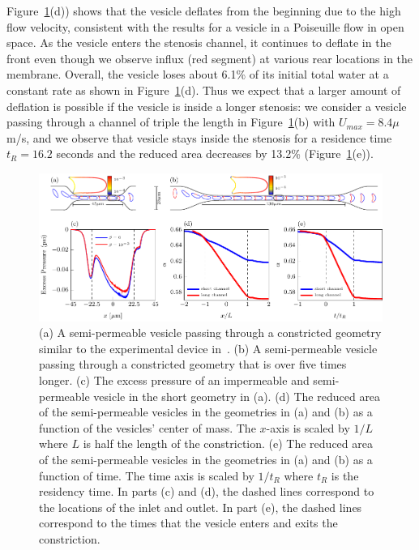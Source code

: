 \documentclass[9pt,twocolumn,twoside,lineno]{pnas-new}
\newif\ifTikz
\begin{document}
Figure~\ref{fig:stenosisComposite}(d)) shows
that the vesicle
deflates from the beginning due to the high flow velocity, consistent
with the results for a vesicle in a Poiseuille flow in open space. As
the vesicle enters the stenosis channel, it continues to
deflate in the front even though we observe influx (red segment) at
various rear locations in the membrane. Overall, the vesicle loses about 6.1\% of its initial total water at a constant rate as shown in
Figure~\ref{fig:stenosisComposite}(d).  Thus we expect that a larger amount of deflation is possible
if the vesicle is inside a longer stenosis: we consider a vesicle passing
through a channel of triple the length in
Figure~\ref{fig:stenosisComposite}(b) with $U_{max}=8.4 \mu$m/s, and we observe that vesicle stays inside the stenosis  for a residence time $t_R=16.2$ seconds and the reduced
area decreases by 13.2\% (Figure~\ref{fig:stenosisComposite}(e)).

\begin{figure}[htp]
  \ifTikz
  
  \else
  \includegraphics{figures/stenosisComposite.pdf}
  \fi
  \caption{\label{fig:stenosisComposite} (a) A semi-permeable vesicle
  passing through a constricted geometry similar to the experimental
  device in~\cite{abk-fai-sto2006}. (b) A semi-permeable vesicle passing
  through a constricted geometry that is over five times longer. (c) The
  excess pressure of an impermeable and semi-permeable vesicle in the
  short geometry in (a). (d) The reduced area of the semi-permeable
  vesicles in the geometries in (a) and (b) as a function of the
  vesicles' center of mass. The $x$-axis is scaled by $1/L$ where $L$ is
  half the length of the constriction. (e) The reduced area of the
  semi-permeable vesicles in the geometries in (a) and (b) as a function
  of time. The time axis is scaled by $1/t_R$ where $t_R$ is the
  residency time. In parts (c) and (d), the dashed lines correspond to
  the locations of the inlet and outlet. In part (e), the dashed lines
  correspond to the times that the vesicle enters and exits the
  constriction.}
\end{figure}
\end{document}
